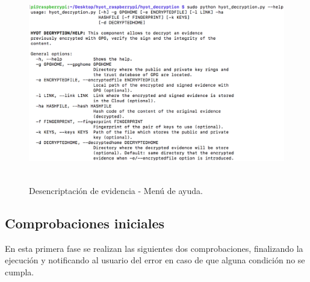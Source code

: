 \documentclass[12pt,a4paper, twoside]{report}
\begin{document}
	\begin{figure}[!ht]   
		\caption{Desencriptación de evidencia - Menú de ayuda.} 
		\begin{center} 
			\includegraphics[width=16cm,height=8cm]{Images/userGuide/evidence/help} \\
			\label{fig:userguide_evidence_help} 
		\end{center}  
	\end{figure}
	
	\newpage
			 
	 \subsection{Comprobaciones iniciales}
	 
	 En esta primera fase se realizan las siguientes dos comprobaciones, finalizando la ejecución y notificando al usuario del error en caso de que alguna condición no se cumpla. 
	 
\end{document}
